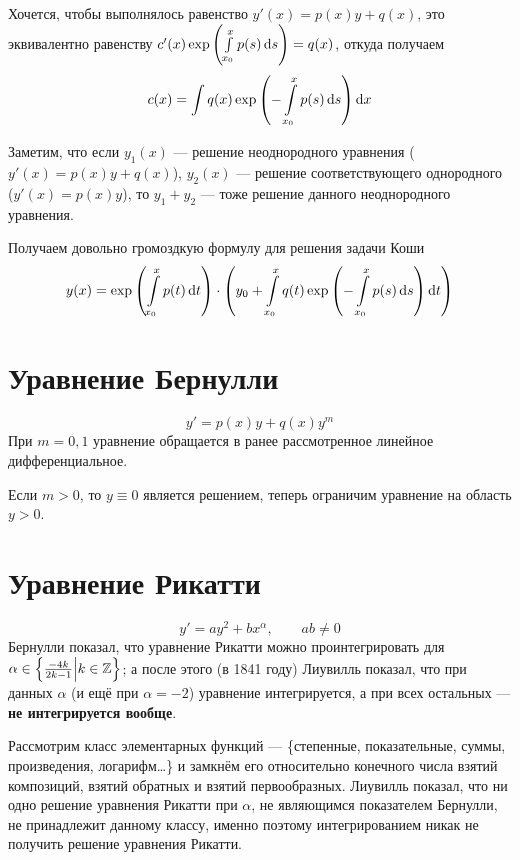 \documentclass[a4paper]{report}
\begin{document}
{        Хочется, чтобы выполнялось равенство $y'(x) = p(x)y + q(x)$, это эквивалентно равенству $c'(x)\exp\left(\int\limits_{x_0}^{x}p(s)\operatorname{d}\! s\right) = q(x)$, откуда получаем
        \[c(x) = \int q(x)\exp\left(-\int\limits_{x_0}^{x}p(s)\operatorname{d}\! s\right)\operatorname{d}\! x\]

        \item Заметим, что если $y_1(x)$ --- решение неоднородного уравнения ($y'(x) = p(x)y + q(x)$), $y_2(x)$ --- решение соответствующего однородного ($y'(x) = p(x)y$), то $y_1 + y_2$ --- тоже решение данного неоднородного уравнения.

        Получаем довольно громоздкую формулу для решения задачи Коши
        \[y(x) = \exp\left(\int\limits_{x_0}^{x}p(t)\operatorname{d}\! t\right)\cdot \left(y_0 + \int\limits_{x_0}^{x}q(t)\exp\left(-\int\limits_{x_0}^{x}p(s)\operatorname{d}\! s\right)\operatorname{d}\! t\right)\]
    }


    \section{Уравнение Бернулли}
    \[y' = p(x)y + q(x)y^m\]
    При $m = 0, 1$ уравнение обращается в ранее рассмотренное линейное дифференциальное.

    Если $m > 0$, то $y \equiv 0$ является решением, теперь ограничим уравнение на область $y > 0$.


    \section{Уравнение Рикатти}
    \[y' = ay^2 + bx^{\alpha}, \qquad ab \ne 0\]
    Бернулли показал, что уравнение Рикатти можно проинтегрировать для $\alpha \in \left\{\frac{-4 k}{2k - 1}\middle|k \in \mathbb{Z}\right\}$;
    а после этого (в 1841 году) Лиувилль показал, что при данных $\alpha$ (и ещё при $\alpha = -2$) уравнение интегрируется, а при всех остальных --- \textbf{не интегрируется вообще}.

    Рассмотрим класс элементарных функций --- \{степенные, показательные, суммы, произведения, логарифм\ldots\} и замкнём его относительно конечного числа взятий композиций, взятий обратных и взятий первообразных.
    Лиувилль показал, что ни одно решение уравнения Рикатти при $\alpha$, не являющимся показателем Бернулли, не принадлежит данному классу, именно поэтому интегрированием никак не получить решение уравнения Рикатти.
\end{document}
